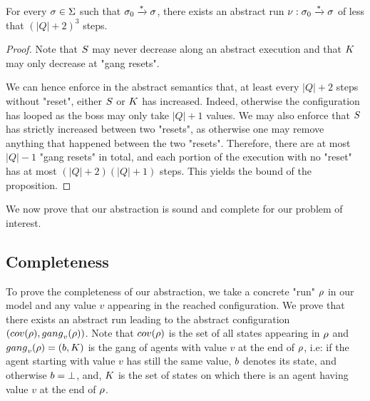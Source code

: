 \begin{lemma}
	\label{lem:short-run}
For every $\sigma \in \Sigma$ such that $\sigma_0 \xrightarrow{*} \sigma$, there exists an abstract run $\nu: \sigma_0 \xrightarrow{*} \sigma$ of less that $(|Q|+2)^3$ steps.
\end{lemma}

\ifproofs
\begin{proof}
Note that $S$ may never decrease along an abstract execution and that $\clique$ may only decrease at "gang resets".

We can hence enforce in the abstract semantics that, at least every $|Q|+2$ steps without "reset", either $S$ or $\clique$ has increased. Indeed, otherwise the configuration has looped as the boss may only take $|Q| +1$ values. We may also enforce that $S$ has strictly increased between two "resets", as otherwise one may remove anything that happened between the two "resets". Therefore, there are at most $|Q|-1$ "gang resets" in total, and each portion of the execution with no "reset" has at most $(|Q|+2)(|Q|+1)$ steps. This yields the bound of the proposition. 
\end{proof}
\fi

We now prove that our abstraction is sound and complete for our problem of interest. 

\subsection{Completeness}

To prove the completeness of our abstraction, we take a concrete "run" $\rho$ in our model and any value $v$ appearing in the reached configuration. We prove that there exists an abstract run leading to the abstract configuration $(\statesin{\run}, \gangof{v}{\run})$. Note that $\statesin{\run}$ is the set of all states appearing in $\rho$ and $\gangof{v}{\run} = (\boss, \clique)$ is the gang of agents with value $v$ at the end of $\rho$, i.e: if the agent starting with value $v$ has still the same value, $\boss$ denotes its state, and otherwise $\boss = \bot$, and, $\clique$ is the set of states on which there is an agent having value $v$ at the end of $\rho$.

